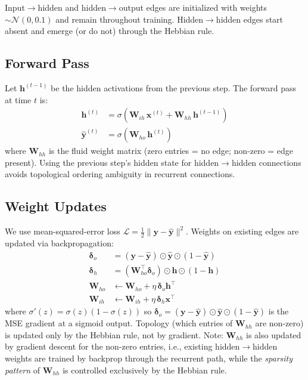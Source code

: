 \documentclass[12pt]{article}
\begin{document}
Input$\to$hidden and hidden$\to$output edges are initialized with weights $\sim \mathcal{N}(0, 0.1)$ and remain throughout training. Hidden$\to$hidden edges start absent and emerge (or do not) through the Hebbian rule.

\subsection{Forward Pass}

Let $\mathbf{h}^{(t-1)}$ be the hidden activations from the previous step. The forward pass at time $t$ is:
\begin{align}
\mathbf{h}^{(t)} &= \sigma\!\left(\mathbf{W}_{ih}\,\mathbf{x}^{(t)} + \mathbf{W}_{hh}\,\mathbf{h}^{(t-1)}\right) \\
\hat{\mathbf{y}}^{(t)} &= \sigma\!\left(\mathbf{W}_{ho}\,\mathbf{h}^{(t)}\right)
\end{align}
where $\mathbf{W}_{hh}$ is the fluid weight matrix (zero entries = no edge; non-zero = edge present). Using the previous step's hidden state for hidden$\to$hidden connections avoids topological ordering ambiguity in recurrent connections.

\subsection{Weight Updates}

We use mean-squared-error loss $\mathcal{L} = \frac{1}{2}\|\mathbf{y} - \hat{\mathbf{y}}\|^2$.
Weights on existing edges are updated via backpropagation:
\begin{align}
\boldsymbol{\delta}_o &= (\mathbf{y} - \hat{\mathbf{y}}) \odot \hat{\mathbf{y}} \odot (1 - \hat{\mathbf{y}}) \\
\boldsymbol{\delta}_h &= (\mathbf{W}_{ho}^\top \boldsymbol{\delta}_o) \odot \mathbf{h} \odot (1 - \mathbf{h}) \\
\mathbf{W}_{ho} &\leftarrow \mathbf{W}_{ho} + \eta\, \boldsymbol{\delta}_o \mathbf{h}^\top \\
\mathbf{W}_{ih} &\leftarrow \mathbf{W}_{ih} + \eta\, \boldsymbol{\delta}_h \mathbf{x}^\top
\end{align}
where $\sigma'(z) = \sigma(z)(1-\sigma(z))$ so $\boldsymbol{\delta}_o = (\mathbf{y}-\hat{\mathbf{y}}) \odot \hat{\mathbf{y}} \odot (1-\hat{\mathbf{y}})$ is the MSE gradient at a sigmoid output.
Topology (which entries of $\mathbf{W}_{hh}$ are non-zero) is updated only by the Hebbian rule, not by gradient.
Note: $\mathbf{W}_{hh}$ is also updated by gradient descent for the non-zero entries, i.e., existing hidden$\to$hidden weights are trained by backprop through the recurrent path, while the \emph{sparsity pattern} of $\mathbf{W}_{hh}$ is controlled exclusively by the Hebbian rule.
\end{document}
